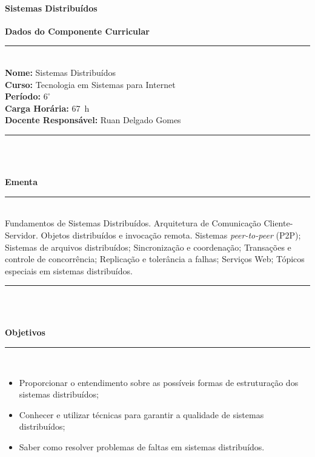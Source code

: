 \paragraph{Sistemas Distribu\'idos}

\begin{center}\textbf{Dados do Componente Curricular}\end{center}
\vspace{-5mm}
\noindent\rule{16.5cm}{0.4pt}
\\
\textbf{Nome:} Sistemas Distribuídos
\\ 
\textbf{Curso:} Tecnologia em Sistemas para Internet
\\ 
\textbf{Período:} $6^{\circ}$
\\ 
\textbf{Carga Horária:} 67~h
\\ 
\textbf{Docente Responsável:} Ruan Delgado Gomes
\\ 
\noindent\rule{16.5cm}{0.4pt}\\
\\
\vspace{-12mm}
\begin{center}\textbf{Ementa}\end{center}
\vspace{-5mm}
\noindent\rule{16.5cm}{0.4pt}
\\
Fundamentos de Sistemas Distribuídos. Arquitetura de Comunicação Cliente-Servidor. Objetos distribu\'idos e invoca\c{c}\~ao remota. Sistemas \textit{peer-to-peer} (P2P); Sistemas de arquivos distribuídos; Sincronização e coordena\c{c}\~ao; Transações e controle de concorr\^encia; Replicação e tolerância a falhas; Serviços Web; T\'opicos especiais em sistemas distribu\'idos.\\ 
\noindent\rule{16.5cm}{0.4pt}\\
\\
\vspace{-12mm}
\begin{center}\textbf{Objetivos}\end{center}
\vspace{-5mm}
\noindent\rule{16.5cm}{0.4pt}
\\
\begin{itemize}
\item Proporcionar o entendimento sobre as possíveis formas de estruturação dos sistemas distribuídos;
\item Conhecer e utilizar técnicas para garantir a qualidade de sistemas distribuídos;
\item Saber como resolver problemas de faltas em sistemas distribuídos.
\end{itemize} 
